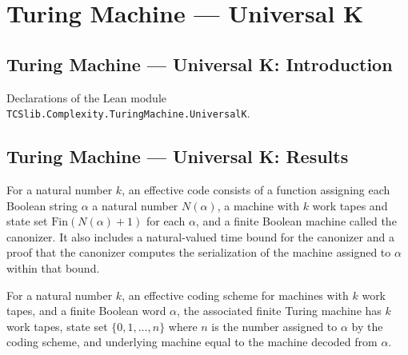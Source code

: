 \section{Turing Machine --- Universal K}
\subsection*{Turing Machine --- Universal K: Introduction}

Declarations of the Lean module \texttt{TCSlib.Complexity.TuringMachine.UniversalK}.

\subsection*{Turing Machine --- Universal K: Results}

\begin{definition}
\label{Turing.EffectiveCodeK}
\leanok
{}
For a natural number $k$, an effective code consists of a function assigning each
Boolean string $\alpha$ a natural number $N(\alpha)$, a machine with $k$ work tapes and
state set $\mathrm{Fin}(N(\alpha)+1)$ for each $\alpha$, and a finite Boolean machine
called the canonizer. It also includes a natural-valued time bound for the canonizer and
a proof that the canonizer computes the serialization of the machine assigned to
$\alpha$ within that bound.
\end{definition}

\begin{definition}
\label{Turing.EffectiveCodeK.toFinTM}
\leanok
{}
For a natural number $k$, an effective coding scheme for machines with $k$ work tapes,
and a finite Boolean word $\alpha$, the associated finite Turing machine has $k$ work
tapes, state set $\{0,1,\ldots,n\}$ where $n$ is the number assigned to $\alpha$ by the
coding scheme, and underlying machine equal to the machine decoded from $\alpha$.
\end{definition}

